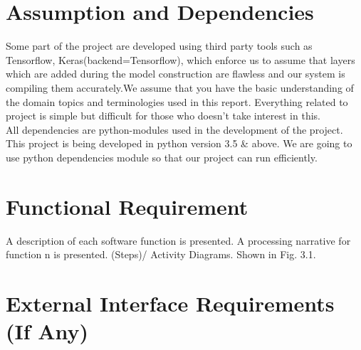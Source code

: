 \documentclass[oneside,a4paper,12pt]{report}
\begin{document}
\section{Assumption and Dependencies}
Some part of the project are developed using third party tools such as Tensorflow, Keras(backend=Tensorflow), which enforce us to assume that layers which are added during the model construction are flawless and our system is compiling them accurately.We assume that you have the basic understanding of the domain topics and terminologies used in this report. Everything related to project is simple but difficult for those who doesn't take interest in this.\\
All dependencies are python-modules used in the development of the project.
This project is being developed in python version 3.5 \& above. We are going to use python dependencies module so that our project can run efficiently.
\section{Functional Requirement}
A description of each software function is presented. A processing narrative for function n is presented. (Steps)/ Activity Diagrams. Shown in Fig. 3.1.


\section{External Interface Requirements (If Any)}
\end{document}
